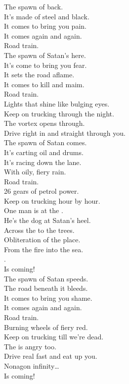 
The spawn of  back. \\
It's made of steel and black. \\
It comes to bring you pain. \\
It comes again and again. \\
Road train. \\

The spawn of Satan's here. \\
It's come to bring you fear. \\
It sets the road aflame. \\
It comes to kill and maim. \\
Road train. \\

Lights that shine like bulging eyes. \\
Keep on trucking through the night. \\
The vortex opens through. \\
Drive right in and straight through you. \\

The spawn of Satan comes. \\
It's carting oil and drums. \\
It's racing down the lane. \\
With oily, fiery rain. \\
Road train. \\

26 gears of petrol power. \\
Keep on trucking hour by hour. \\
One man is at the . \\
He's the dog at Satan's heel. \\

Across the  to the trees. \\
Obliteration of the place. \\
From the fire into the sea. \\
. \\
Is coming! \\

The spawn of Satan speeds. \\
The road beneath it bleeds. \\
It comes to bring you shame. \\
It comes again and again. \\
Road train. \\

Burning wheels of fiery red. \\
Keep on trucking till we're dead. \\
The  is angry too. \\
Drive real fast and eat up you. \\

Nonagon infinity… \\
Is coming! \\
